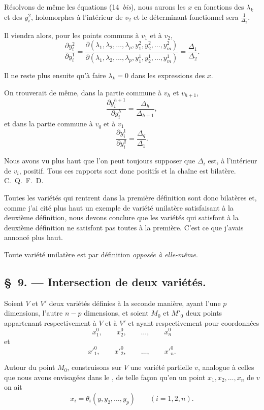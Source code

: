 \documentclass{article}
\begin{document}
Résolvons de même les équations (14~\emph{bis}), nous aurons les $x$ en fonctions des $\lambda_{k}$ et des $y^{2}_{i}$, holomorphes à l'intérieur de $v_{2}$ et le déterminant fonctionnel sera $\frac{1}{\Delta_{2}}$.

Il viendra alors, pour les points communs à $v_{1}$ et à $v_{2}$,
\[
\frac{\partial y^{2}_{i}}{\partial y^{1}_{i}} = \frac{\partial(\lambda_{1}, \lambda_{2}, \ldots, \lambda_{p}, y^{2}_{1}, y^{2}_{2}, \ldots, y^{2}_{m})}{\partial(\lambda_{1}, \lambda_{2}, \ldots, \lambda_{p}, y^{1}_{1}, y^{1}_{2}, \ldots, y^{1}_{m})} = \frac{\Delta_{1}}{\Delta_{2}}.
\]

Il ne reste plus ensuite qu'à faire $\lambda_{k} = 0$ dans les expressions des $x$.

On trouverait de même, dans la partie commune à $v_{h}$ et $v_{h+1}$,
\[
\frac{\partial y^{h+1}_{i}}{\partial y^{h}_{i}} = \frac{\Delta_{h}}{\Delta_{h+1}},
\]
et dans la partie commune à $v_{q}$ et à $v_{1}$
\[
\frac{\partial y^{1}_{i}}{\partial y^{q}_{i}} = \frac{\Delta_{q}}{\Delta_{1}}.
\]

Nous avons vu plus haut que l'on peut toujours supposer que $\Delta_{i}$ est,
à l'intérieur de $v_{i}$, positif. Tous ces rapports sont donc positifs et la chaîne est bilatère. C.~Q.~F.~D.

Toutes les variétés qui rentrent dans la première définition sont donc bilatères et, comme j'ai cité plus haut un exemple de variété unilatère satisfaisant à la deuxième définition, nous devons conclure que les variétés qui satisfont à la deuxième définition ne satisfont pas toutes à la première. C'est ce que j'avais annoncé plus haut.

Toute variété unilatère est par définition \emph{opposée à elle-même}.

\subsection*{\S~9. --- Intersection de deux variétés.}

Soient $V$ et $V'$ deux variétés définies à la seconde manière, ayant l'une $p$ dimensions, l'autre $n-p$ dimensions, et soient $M_{0}$ et $M'_{0}$ deux points appartenant respectivement à $V$ et à $V'$ et ayant respectivement pour coordonnées
\[
x^{0}_{1}, \qquad x^{0}_{2}, \qquad \ldots, \qquad x^{0}_{n}
\]
et
\[
x'^{0}_{1}, \qquad x'^{0}_{2}, \qquad \ldots, \qquad x'^{0}_{n}.
\]

Autour du point $M_{0}$, construisons sur $V$ une variété partielle $v$, analogue à celles que nous avons envisagées dans le , de telle façon qu'en un point $x_{1}, x_{2}, \ldots, x_{n}$ de $v$ on ait
\[
x_{i} = \theta_{i}(y, y_{2}, \ldots, y_{p}) \qquad (i = 1, 2, n).
\]
\end{document}
